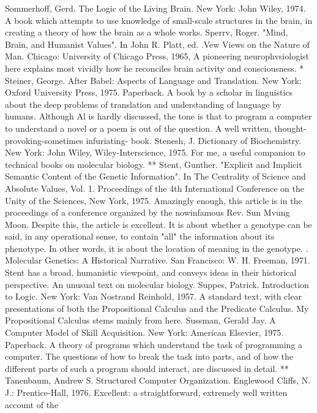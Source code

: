 Sommerhoff, Gerd. The Logic of the Living Brain. New York: John Wiley, 1974. A book
  which attempts to use knowledge of small-scale structures in the brain, in creating a
  theory of how the brain as a whole works.
Sperrv, Roger. "Mind, Brain, and Humanist Values". In John R. Platt, ed. .Vew Views on
  the Nature of Man. Chicago: University of Chicago Press, 1965, A pioneering
  neurophvsiologist here explains most vividly how he reconciles brain activity and
  consciousness.
* Steiner, George. After Babel: Aspects of Language and Translation. New York: Oxford
  University Press, 1975. Paperback. A book by a scholar in linguistics about the deep
  problems of translation and understanding of language by humans. Although Al is
  hardly discussed, the tone is that to program a computer to understand a novel or a
  poem is out of the question. A well written, thought-provoking-sometimes infuriating-
  book.
Stenesh, J. Dictionary of Biochemistry. New York: John Wiley, Wiley-Interscience,
  1975. For me, a useful companion to technical books on molecular biology.
** Stent, Gunther. "Explicit and Implicit Semantic Content of the Genetic Information".
  In The Centrality of Science and Absolute Values, Vol. 1. Proceedings of the 4th
  International Conference on the Unity of the Sciences, New York, 1975. Amazingly
  enough, this article is in the proceedings of a conference organized by the nowinfamous
  Rev. Sun Mvung Moon. Despite this, the article is excellent. It is about whether a
  genotype can be said, in any operational sense, to contain "all" the information about its
  phenotype. In other words, it is about the location of meaning in the genotype.
. Molecular Genetics: A Historical Narrative. San Francisco: W. H. Freeman, 1971. Stent
  has a broad, humanistic viewpoint, and conveys ideas in their historical perspective. An
  unusual text on molecular biology.
Suppes, Patrick. Introduction to Logic. New York: Van Nostrand Reinhold, 1957. A
  standard text, with clear presentations of both the Propositional Calculus and the
  Predicate Calculus. My Propositional Calculus stems mainly from here.
Sussman, Gerald Jay. A Computer Model of Skill Acquisition. New York: American
  Elsevier, 1975. Paperback. A theory of programs which understand the task of
  programming a computer. The questions of how to break the task into parts, and of how
  the different parts of such a program should interact, are discussed in detail.
** Tanenbaum, Andrew S. Structured Computer Organization. Englewood Cliffs, N. J.:
  Prentice-Hall, 1976. Excellent: a straightforward, extremely well written account of the
